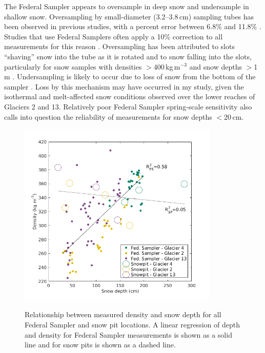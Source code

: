 \documentclass{sfuthesis}
\begin{document}
The Federal Sampler appears to oversample in deep snow and undersample in shallow snow. Oversampling by small-diameter (3.2--3.8\,cm) sampling tubes has been observed in previous studies, with a percent error between 6.8\% and 11.8\% \citep[e.g.][]{Work1965, Fames1982, Conger2009}. Studies that use Federal Samplers often apply a 10\% correction to all measurements for this reason \citep[e.g.][]{Molotch2005}. Oversampling has been attributed to slots ``shaving'' snow into the tube as it is rotated \citep[e.g.][]{Dixon2012} and to snow falling into the slots, particularly for snow samples with densities $>$400\,kg\,m$^{-3}$ and snow depths $>$1\,m \citep[e.g.][]{Beaumont1963}. Undersampling is likely to occur due to loss of snow from the bottom of the sampler \citep{Turcan1975}. Loss by this mechanism may have occurred in my study, given the isothermal and melt-affected snow conditions observed over the lower reaches of Glaciers 2 and 13. Relatively poor Federal Sampler spring-scale sensitivity also calls into question the reliability of measurements for snow depths $<$20\,cm.



\begin{figure}[p]
	\centering
	\includegraphics[width =0.85\textwidth]{DepthDensity_SWEonly.png}\\
	\caption{Relationship between measured density and snow depth for all Federal Sampler and snow pit locations. A linear regression of depth and density for Federal Sampler measurements is shown as a solid line and for snow pits is shown as a dashed line.}
	\label{fig:all_depth}
\end{figure}
\end{document}
